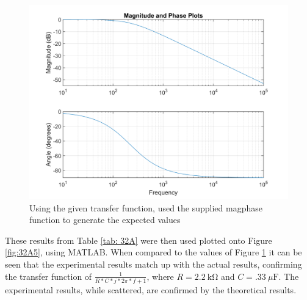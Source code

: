 \documentclass[10pt]{article}
\begin{document}
\begin{center}
	\begin{figure} [H]
		\centering
		\includegraphics[scale=0.4]{images/matlabRC.png}
		\caption{Using the given transfer function, used the supplied magphase function to generate the expected values}
		\label{fig:32A6}
	\end{figure}
\end{center}
These results from Table \ref{tab: 32A} were then used plotted onto Figure \ref{fig:32A5}, using MATLAB. When compared to the values of Figure \ref{fig:32A6} it can be seen that the experimental results match up with the actual results, confirming the transfer function of $\frac{1}{R*C*j*2\pi*f+1}$, where $R = \SI{2.2}{\kilo\ohm}$ and $C = \SI{.33}{\mu\farad}$. The experimental results, while scattered, are confirmed by the theoretical results. 
\end{document}
